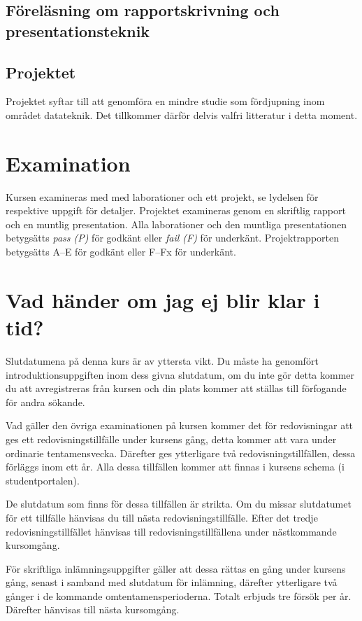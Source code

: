 \documentclass[a4paper,logo]{miunart}
\begin{document}
\subsection{Föreläsning om rapportskrivning och presentationsteknik}


\subsection{Projektet}
Projektet syftar till att genomföra en mindre studie som fördjupning inom 
området datateknik.
Det tillkommer därför delvis valfri litteratur i detta moment.


\section{Examination}
\label{sec:exam}
Kursen examineras med med laborationer och ett projekt, se lydelsen för 
respektive uppgift för detaljer.
Projektet examineras genom en skriftlig rapport och en muntlig presentation.
Alla laborationer och den muntliga presentationen betygsätts \emph{pass (P)} 
för godkänt eller \emph{fail (F)} för underkänt.
Projektrapporten betygsätts A--E för godkänt eller F--Fx för underkänt.


\section{Vad händer om jag ej blir klar i tid?}
\label{sec:late}
Slutdatumena på denna kurs är av yttersta vikt.
Du måste ha genomfört introduktionsuppgiften inom dess givna slutdatum, om du 
inte gör detta kommer du att avregistreras från kursen och din plats kommer att 
ställas till förfogande för andra sökande.

Vad gäller den övriga examinationen på kursen kommer det för redovisningar att 
ges ett redovisningstillfälle under kursens gång, detta kommer att vara under 
ordinarie tentamensvecka.
Därefter ges ytterligare två redovisningstillfällen, dessa förläggs inom ett 
år.
Alla dessa tillfällen kommer att finnas i kursens schema (i studentportalen).

De slutdatum som finns för dessa tillfällen är strikta.
Om du missar slutdatumet för ett tillfälle hänvisas du till nästa 
redovisningstillfälle.
Efter det tredje redovisningstillfället hänvisas till redovisningstillfällena 
under nästkommande kursomgång.

För skriftliga inlämningsuppgifter gäller att dessa rättas en gång under 
kursens gång, senast i samband med slutdatum för inlämning, därefter 
ytterligare två gånger i de kommande omtentamensperioderna.
Totalt erbjuds tre försök per år.
Därefter hänvisas till nästa kursomgång.
\end{document}

